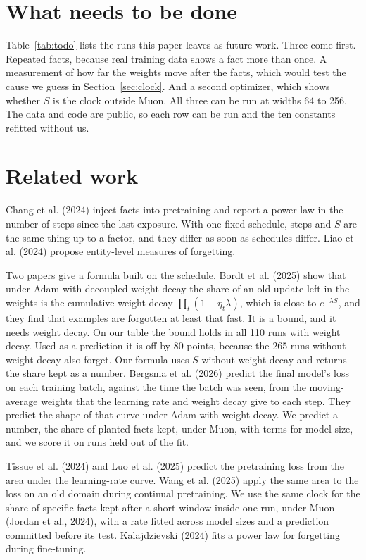 \documentclass{article}
\begin{document}
\section{What needs to be done}
\label{sec:todo}

Table~\ref{tab:todo} lists the runs this paper leaves as future work. Three come first. Repeated facts, because real training data shows a fact more than once. A measurement of how far the weights move after the facts, which would test the cause we guess in Section~\ref{sec:clock}. And a second optimizer, which shows whether $S$ is the clock outside Muon. All three can be run at widths 64 to 256. The data and code are public, so each row can be run and the ten constants refitted without us.

\section{Related work}

Chang et al. (2024) inject facts into pretraining and report a power law in the number of steps since the last exposure. With one fixed schedule, steps and $S$ are the same thing up to a factor, and they differ as soon as schedules differ. Liao et al. (2024) propose entity-level measures of forgetting.

Two papers give a formula built on the schedule. Bordt et al. (2025) show that under Adam with decoupled weight decay the share of an old update left in the weights is the cumulative weight decay $\prod_t (1-\eta_t\lambda)$, which is close to $e^{-\lambda S}$, and they find that examples are forgotten at least that fast. It is a bound, and it needs weight decay. On our table the bound holds in all 110 runs with weight decay. Used as a prediction it is off by 80 points, because the 265 runs without weight decay also forget. Our formula uses $S$ without weight decay and returns the share kept as a number. Bergsma et al. (2026) predict the final model's loss on each training batch, against the time the batch was seen, from the moving-average weights that the learning rate and weight decay give to each step. They predict the shape of that curve under Adam with weight decay. We predict a number, the share of planted facts kept, under Muon, with terms for model size, and we score it on runs held out of the fit.

Tissue et al. (2024) and Luo et al. (2025) predict the pretraining loss from the area under the learning-rate curve. Wang et al. (2025) apply the same area to the loss on an old domain during continual pretraining. We use the same clock for the share of specific facts kept after a short window inside one run, under Muon (Jordan et al., 2024), with a rate fitted across model sizes and a prediction committed before its test. Kalajdzievski (2024) fits a power law for forgetting during fine-tuning.
\end{document}
